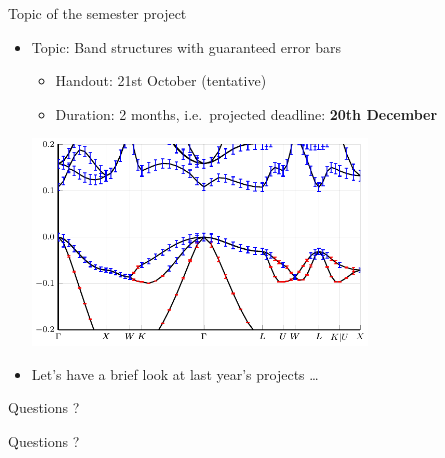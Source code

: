 \begin{frame}{Topic of the semester project}
    \begin{itemize}
        \item Topic: \alert{Band structures with guaranteed error bars}
            \begin{itemize}
                \vspace{-0.5em}
                \item Handout: 21st October \textcolor{grey5}{(tentative)}
                \vspace{-0.5em}
                \item Duration: 2 months, i.e.~projected deadline: \textbf{20th December}
            \end{itemize}
        \vspace{1.5em}
        \begin{center}
        \includegraphics[width=0.7\textwidth]{img/si_band_errors.pdf}
        \end{center}
        \vspace{0.5em}
        \item Let's have a brief look at last year's projects \ldots
    \end{itemize}
\end{frame}

\begin{frame}{Questions ?}
    \begin{center}
        \huge{Questions ?}
    \end{center}
\end{frame}
